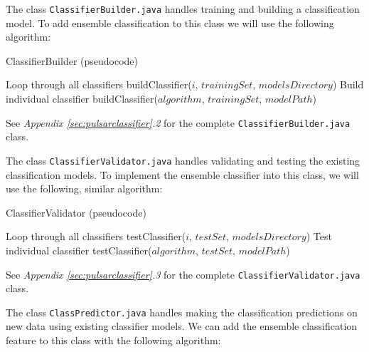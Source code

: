 \documentclass{article}
\begin{document}
The class \verb|ClassifierBuilder.java| handles training and building a classification model. To add ensemble classification to this class we will use the following algorithm:

\begin{algorithm}[H]
    \caption{ClassifierBuilder (pseudocode)}
    \begin{algorithmic}[1]
                \Comment Loop through all classifiers
                \State buildClassifier($i$, $trainingSet$, $modelsDirectory$)
            \EndFor
        \Else 
            \Comment Build individual classifier
            \State buildClassifier($algorithm$, $trainingSet$, $modelPath$)
            
        \EndIf
        
    \end{algorithmic}
\end{algorithm}

See \emph{Appendix \ref{sec:pulsarclassifier}.2} for the complete \verb|ClassifierBuilder.java| class. 

The class \verb|ClassifierValidator.java| handles validating and testing the existing classification models. To implement the ensemble classifier into this class, we will use the following, similar algorithm:

\begin{algorithm}[H]
    \caption{ClassifierValidator (pseudocode)}
    \begin{algorithmic}[1]
                \Comment Loop through all classifiers
                \State testClassifier($i$, $testSet$, $modelsDirectory$)
            \EndFor
        \Else 
            \Comment Test individual classifier
            \State testClassifier($algorithm$, $testSet$, $modelPath$)
        \EndIf
        
    \end{algorithmic}
\end{algorithm}

See \emph{Appendix \ref{sec:pulsarclassifier}.3} for the complete \verb|ClassifierValidator.java| class. 

The class \verb|ClassPredictor.java| handles making the classification predictions on new data using existing classifier models. We can add the ensemble classification feature to this class with the following algorithm:
\end{document}
